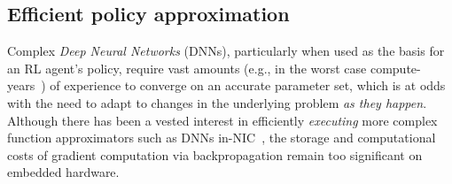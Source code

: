 \documentclass[sigconf,natbib=false]{acmart}
\begin{document}
\subsection{Efficient policy approximation}
Complex \emph{Deep Neural Networks} (DNNs), particularly when used as the basis for an RL agent's policy, require vast amounts (e.g., in the worst case compute-years~\parencite{DBLP:journals/corr/abs-1912-06680}) of experience to converge on an accurate parameter set, which is at odds with the need to adapt to changes in the underlying problem \emph{as they happen}.
Although there has been a vested interest in efficiently \emph{executing} more complex function approximators such as DNNs in-NIC~\parencite{DBLP:journals/corr/abs-2002-08987,DBLP:journals/corr/abs-2009-02353,DBLP:conf/sigcomm/SanvitoSB18,DBLP:journals/corr/abs-1801-05731,langlet-ml-netronome}, the storage and computational costs of gradient computation via backpropagation remain too significant on embedded hardware.

\end{document}
